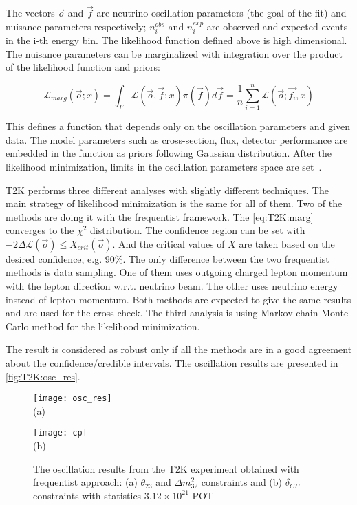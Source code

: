 \documentclass[../main.tex]{subfiles}
\begin{document}
The vectors $\overrightarrow{o}$ and $\overrightarrow{f}$ are neutrino oscillation parameters (the goal of the fit) and nuisance parameters respectively; $n_i^{obs}$ and $n_i^{exp}$ are observed and expected events in the i-th energy bin. The likelihood function defined above is high dimensional. The nuisance parameters can be marginalized with integration over the product of the likelihood function and priors:

\begin{equation}
\mathcal{L}_{marg}\left(\overrightarrow{o}; x\right)=\int_F\mathcal{L}\left(\overrightarrow{o},\overrightarrow{f};x\right)\pi(\overrightarrow{f})d\overrightarrow{f}=\frac{1}{n}\sum_{i=1}^{n}\mathcal{L}\left(\overrightarrow{o}; \overrightarrow{f_i}, x\right)
\label{eq:T2K:marg}
\end{equation}

This defines a function that depends only on the oscillation parameters and given data. The model parameters such as cross-section, flux, detector performance are embedded in the function as priors following Gaussian distribution. After the likelihood minimization, limits in the oscillation parameters space are set~\cite{Cousins1992}.

T2K performs three different analyses with slightly different techniques. The main strategy of likelihood minimization is the same for all of them. Two of the methods are doing it with the frequentist framework. The \autoref{eq:T2K:marg} converges to the $\chi^2$ distribution. The confidence region can be set with $-2\Delta\mathcal{L}(\overrightarrow{o})\leqslant X_{crit}(\overrightarrow{o})$. And the critical values of $X$ are taken based on the desired confidence, e.g. 90\%. The only difference between the two frequentist methods is data sampling. One of them uses outgoing charged lepton momentum with the lepton direction w.r.t. neutrino beam. The other uses neutrino energy instead of lepton momentum. Both methods are expected to give the same results and are used for the cross-check. The third analysis is using Markov chain Monte Carlo method for the likelihood minimization.

The result is considered as robust only if all the methods are in a good agreement about the confidence/credible intervals. The oscillation results are presented in \autoref{fig:T2K:osc_res}.

\begin{figure}[!ht]
  \centering
  \begin{minipage}{0.49\linewidth}
    \centering
    \texttt{[image: osc\_res]} \\ (a)
  \end{minipage}
  \begin{minipage}{0.49\linewidth}
    \centering
    \texttt{[image: cp]} \\ (b)
  \end{minipage}
    \caption{The oscillation results from the T2K experiment obtained with frequentist approach: (a) $\theta_{23}$ and $\Delta m_{32}^2$ constraints and (b) $\delta_{CP}$ constraints with statistics $3.12\times10^21$ POT}
    \label{fig:T2K:osc_res}
\end{figure}
\end{document}
